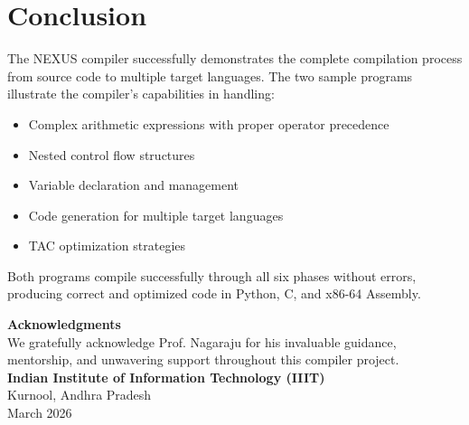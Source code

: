\documentclass[12pt,a4paper]{report}
\begin{document}
\chapter{Conclusion}

The NEXUS compiler successfully demonstrates the complete compilation process from source code to multiple target languages. The two sample programs illustrate the compiler's capabilities in handling:

\begin{itemize}
    \item Complex arithmetic expressions with proper operator precedence
    \item Nested control flow structures
    \item Variable declaration and management
    \item Code generation for multiple target languages
    \item TAC optimization strategies
\end{itemize}

Both programs compile successfully through all six phases without errors, producing correct and optimized code in Python, C, and x86-64 Assembly.

\vspace{2cm}

\begin{center}
\Large \textbf{Acknowledgments}\\
\vspace{0.5cm}
\normalsize
We gratefully acknowledge Prof. Nagaraju for his invaluable guidance,\\
mentorship, and unwavering support throughout this compiler project.\\
\vspace{1cm}
\textbf{Indian Institute of Information Technology (IIIT)}\\
Kurnool, Andhra Pradesh\\
March 2026
\end{center}
\end{document}
